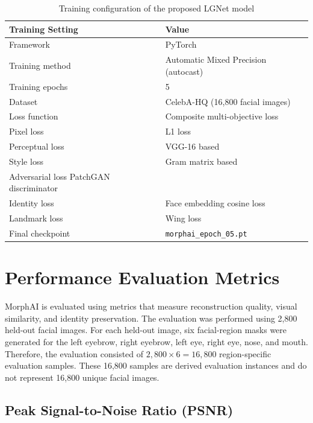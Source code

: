 
\begin{table}[H]
\centering
\caption{Training configuration of the proposed LGNet model}
\label{tab:hparams}
\renewcommand{\arraystretch}{1.3}
\begin{tabular}{|l|l|}
\hline
\textbf{Training Setting} & \textbf{Value} \\ \hline
Framework & PyTorch \\ \hline
Training method & Automatic Mixed Precision (autocast) \\ \hline
Training epochs & 5 \\ \hline
Dataset & CelebA-HQ (16,800 facial images) \\ \hline
Loss function & Composite multi-objective loss \\ \hline
Pixel loss & L1 loss \\ \hline
Perceptual loss & VGG-16 based \\ \hline
Style loss & Gram matrix based \\ \hline
Adversarial loss    PatchGAN discriminator\\ \hline
Identity loss & Face embedding cosine loss \\ \hline
Landmark loss & Wing loss \\ \hline
Final checkpoint & \texttt{morphai\_epoch\_05.pt} \\ \hline
\end{tabular}
\end{table}

\section{Performance Evaluation Metrics}

MorphAI is evaluated using metrics that measure reconstruction quality,
visual similarity, and identity preservation. The evaluation was performed
using 2,800 held-out facial images. For each held-out image, six
facial-region masks were generated for the left eyebrow, right eyebrow,
left eye, right eye, nose, and mouth. Therefore, the evaluation consisted
of $2,800 \times 6 = 16,800$ region-specific evaluation samples. These
16,800 samples are derived evaluation instances and do not represent
16,800 unique facial images.

\subsection{Peak Signal-to-Noise Ratio (PSNR)}

